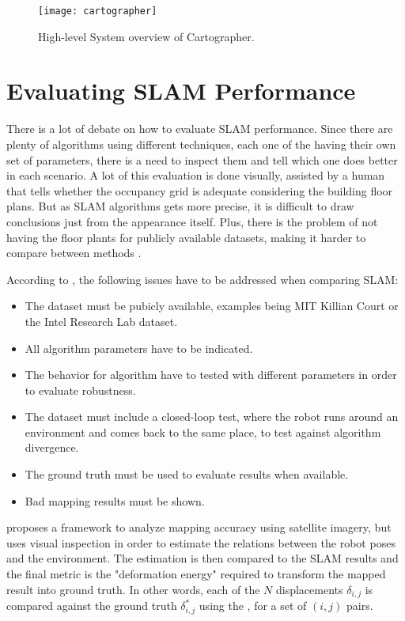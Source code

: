 \begin{figure}
    \centering
    \texttt{[image: cartographer]}
    \caption{High-level System overview of Cartographer.}
    \label{fig:cartographer}
\end{figure}

\section{Evaluating SLAM Performance}

There is a lot of debate on how to evaluate SLAM performance. Since there are plenty of algorithms using different techniques, each one of the having their own set of parameters, there is a need to inspect them and tell which one does better in each scenario. A lot of this evaluation is done visually, assisted by a human that tells whether the occupancy grid is adequate considering the building floor plans. But as SLAM algorithms gets more precise, it is difficult to draw conclusions just from the appearance itself. Plus, there is the problem of not having the floor plants for publicly available datasets, making it harder to compare between methods \cite{kummerle2009measuring}.

According to \citeauthor{amigoni2007good}, the following issues have to be addressed when comparing SLAM:

\begin{itemize}
    \item The dataset must be pubicly available, examples being MIT Killian Court or the Intel Research Lab dataset.
    \item All algorithm parameters have to be indicated.
    \item The behavior for algorithm have to tested with different parameters in order to evaluate robustness.
    \item The dataset must include a closed-loop test, where the robot runs around an environment and comes back to the same place, to test against algorithm divergence.
    \item The ground truth must be used to evaluate results when available.
    \item Bad mapping results must be shown.
\end{itemize}

\citeauthor{kummerle2009measuring} proposes a framework to analyze mapping accuracy using satellite imagery, but uses visual inspection in order to estimate the relations between the robot poses and the environment. The estimation is then compared to the SLAM results and the final metric is the "deformation energy" required to transform the mapped result into ground truth. In other words, each of the $N$ displacements $\delta_{i,j}$ is compared against the ground truth $\delta_{i,j}^*$ using the , for a set of  $(i,j)$ pairs.

